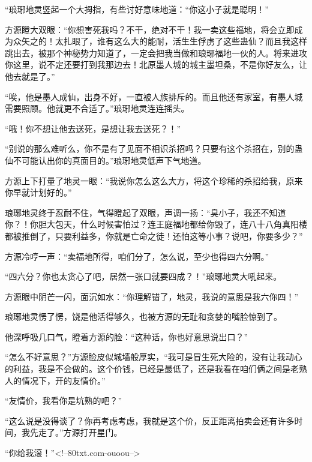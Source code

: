 \begin{this_body}
“琅琊地灵竖起一个大拇指，有些讨好意味地道：“你这小子就是聪明！”

方源瞪大双眼：“你想害死我吗？不干，绝对不干！我一卖这些福地，将会立即成为众矢之的！太扎眼了，谁有这么大的能耐，活生生俘虏了这些蛊仙？而且我这样跳出去，被那个神秘势力知道了，一定会把我当做和琅琊福地一伙的人。将来进攻你这里，说不定还要打到我那边去！北原墨人城的城主墨坦桑，不是你好友么，让他去就是了。”

“唉，他是墨人成仙，出身不好，一直被人族排斥的。而且他还有家室，有墨人城需要照顾。他就更不合适了。”琅琊地灵连连摇头。

“哦！你不想让他去送死，是想让我去送死？！”

“别说的那么难听么，你不是有了见面不相识杀招吗？只要有这个杀招在，别的蛊仙不可能认出你的真面目的。”琅琊地灵低声下气地道。

方源上下打量了地灵一眼：“我说你怎么这么大方，将这个珍稀的杀招给我，原来你早就计划好的。”

琅琊地灵终于忍耐不住，气得瞪起了双眼，声调一扬：“臭小子，我还不知道你？！你胆大包天，什么时候害怕过？连王庭福地都给你毁了，连八十八角真阳楼都被推倒了，只要利益多，你就是亡命之徒！还怕这等小事？说吧，你要多少？”

方源冷哼一声：“卖福地所得，咱们分了，怎么说，至少也得四六分啊。”

“四六分？你也太贪心了吧，居然一张口就要四成？！”琅琊地灵大吼起来。

方源眼中阴芒一闪，面沉如水：“你理解错了，地灵，我说的意思是我六你四！”

琅琊地灵愣了愣，饶是他活得够久，也被方源的无耻和贪婪的嘴脸惊到了。

他深呼吸几口气，瞪着方源的脸：“这种话，你也好意思说出口？”

“怎么不好意思？”方源脸皮似城墙般厚实，“我可是冒生死大险的，没有让我动心的利益，我是不会做的。这个价钱，已经是最低了，还是我看在咱们俩之间是老熟人的情况下，开的友情价。”

“友情价，我看你是坑熟的吧？”

“这么说是没得谈了？你再考虑考虑，我就是这个价，反正距离拍卖会还有许多时间，我先走了。”方源打开星门。

“你给我滚！”<!--80txt.com-ouoou-->

\end{this_body}

